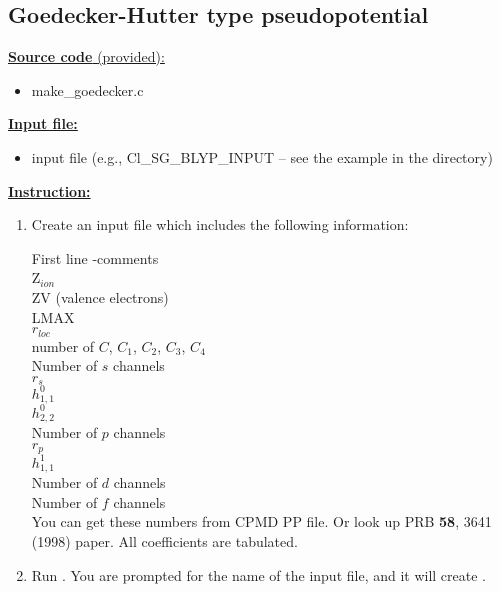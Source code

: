 \subsection{Goedecker-Hutter type pseudopotential}

\noindent
\underline{ {\bf Source code }(provided): }
	\begin{itemize}
	\item make\_goedecker.c
	\end{itemize}

\vskip 12pt
\noindent
\underline{ {\bf Input file:} }
	\begin{itemize}
	\item input file (e.g., Cl\_SG\_BLYP\_INPUT -- see the example in the directory)
	\end{itemize}
	
	
\vskip 12pt
\noindent
\underline{ {\bf Instruction:} }

\begin{enumerate}
\item Create an input file which includes the following information:

First line -comments\\
Z$_{ion}$\\
ZV (valence electrons)\\
LMAX\\
$r_{loc}$\\
number of $C$, $C_1$, $C_2$, $C_3$, $C_4$\\
Number of $s$ channels\\
$r_s$\\
$h^0_{1,1}$\\
$h^0_{2,2}$\\
Number of $p$ channels\\
$r_p$\\
$h^1_{1,1}$\\
Number of $d$ channels\\
Number of $f$ channels\\

You can get these numbers from CPMD PP file. Or look up PRB \textbf{58}, 3641 (1998) paper. All coefficients are tabulated.

\item Run {\selectfont{make\_goedecker.c}}. You are prompted for the name of the input file, and it will create {\selectfont{PSEUDO.OUT}}.


\end{enumerate}




%
